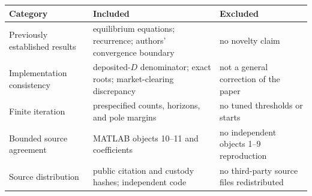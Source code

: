 \begin{tabularx}{\textwidth}{@{}>{\raggedright\arraybackslash}p{}XX@{}}
\toprule
Category & Included & Excluded \\
\midrule
Previously established results & equilibrium equations; recurrence; authors' convergence boundary & no novelty claim \\
Implementation consistency & deposited-$D$ denominator; exact roots; market-clearing discrepancy & not a general correction of the paper \\
Finite iteration & prespecified counts, horizons, and pole margins & no tuned thresholds or starts \\
Bounded source agreement & MATLAB objects 10--11 and coefficients & no independent objects 1--9 reproduction \\
Source distribution & public citation and custody hashes; independent code & no third-party source files redistributed \\
\bottomrule
\end{tabularx}
